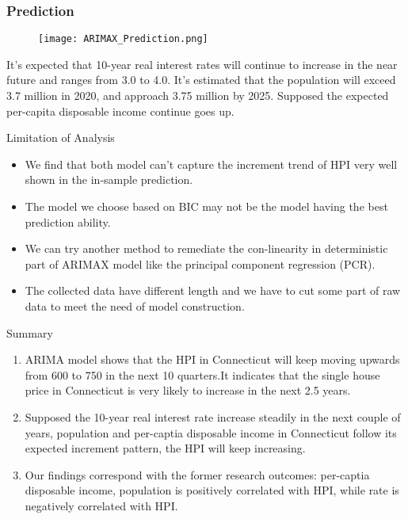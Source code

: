 \documentclass{beamer}
\begin{document}
\begin{frame}
\frametitle{Prediction}
\begin{figure}
    \centering
    \texttt{[image: ARIMAX\_Prediction.png]}
    \label{fig:my_label}
\end{figure}
It’s expected that 10-year real interest rates will continue to increase in the near future and ranges from 3.0 to 4.0.
It's estimated that the population will 
exceed 3.7 million in 2020, and approach 3.75 million by 2025.
Supposed the expected per-capita disposable income continue goes up.
\end{frame}

\begin{frame}{Limitation of Analysis}

\begin{itemize}
    \item We find that both model can't capture the increment trend of HPI very well shown in the in-sample prediction.
    \item The model we choose based on BIC may not be the model having the best prediction ability.
    \item We can try another method to remediate the con-linearity in deterministic part of ARIMAX model like the principal component regression (PCR).
    \item The collected data have different length and we have to cut some part of raw data to meet the need of model construction.
\end{itemize}
\end{frame}

\begin{frame}{Summary}
    \begin{enumerate}
        \item ARIMA model shows that the HPI in Connecticut will keep moving upwards from 600 to 750 in the next 10 quarters.It indicates that the single house price in Connecticut is very likely to increase in the next 2.5 years.
        \item Supposed the 10-year real interest rate increase steadily in the next couple of years, population and per-captia disposable income in Connecticut follow its expected increment pattern, the HPI will keep increasing.
        \item Our findings correspond with the former research outcomes: per-captia disposable income, population is positively correlated with HPI, while rate is negatively correlated with HPI.
    \end{enumerate}
\end{frame}
\end{document}
